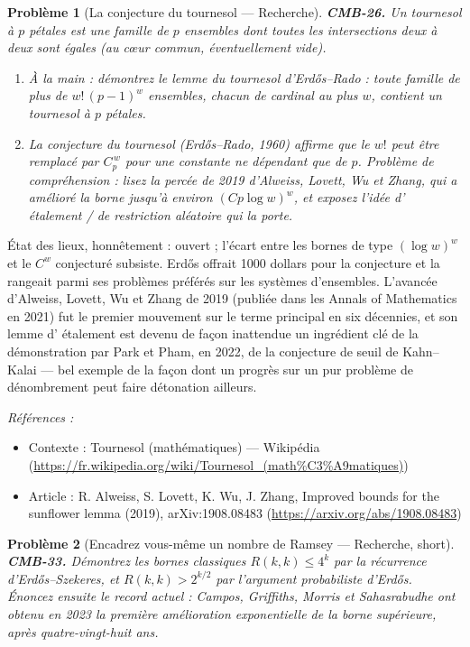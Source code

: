 \documentclass[11pt]{article}
\newtheorem{problem}{Problème}
\newenvironment{refs}{\par\small\noindent\emph{Références :}\begin{itemize}\setlength\itemsep{0pt}}{\end{itemize}\normalsize}
\begin{document}
\begin{problem}[{La conjecture du tournesol --- Recherche}]
\textbf{CMB-26.} Un tournesol à $ p $ pétales est une famille de $ p $ ensembles dont
toutes les intersections deux à deux sont égales (au \og{} c\oe{}ur \fg{} commun, éventuellement vide).
\begin{enumerate}
\item[(a)] À la main : démontrez le lemme du tournesol d'Erd\H{o}s--Rado : toute famille de plus de
$ w!\,(p-1)^w $ ensembles, chacun de cardinal au plus $ w $, contient un tournesol à
$ p $ pétales.
\item[(b)] La conjecture du tournesol (Erd\H{o}s--Rado, 1960) affirme que le $ w! $ peut être remplacé par
$ C_p^{\,w} $ pour une constante ne dépendant que de $ p $. Problème de compréhension : lisez
la percée de 2019 d'Alweiss, Lovett, Wu et Zhang, qui a amélioré la borne jusqu'à environ
$ (C p \log w)^w $, et exposez l'idée d'\og{} étalement \fg{} / de restriction aléatoire qui la
porte.
\end{enumerate}

\end{problem}

\noindent État des lieux, honnêtement : ouvert ; l'écart entre les bornes de type
$ (\log w)^w $ et le $ C^w $ conjecturé subsiste. Erd\H{o}s offrait 1000 dollars pour la
conjecture et la rangeait parmi ses problèmes préférés sur les systèmes d'ensembles. L'avancée
d'Alweiss, Lovett, Wu et Zhang de 2019 (publiée dans les Annals of Mathematics en 2021) fut le
premier mouvement sur le terme principal en six décennies, et son lemme d'\og{} étalement \fg{} est
devenu de façon inattendue un ingrédient clé de la démonstration par Park et Pham, en 2022, de la
conjecture de seuil de Kahn--Kalai --- bel exemple de la façon dont un progrès sur un pur problème de
dénombrement peut faire détonation ailleurs.

\begin{refs}
\item Contexte : Tournesol (mathématiques) --- Wikipédia (\url{https://fr.wikipedia.org/wiki/Tournesol_(math%C3%A9matiques)})
\item Article : R. Alweiss, S. Lovett, K. Wu, J. Zhang, \og{} Improved bounds for the sunflower lemma \fg{} (2019), arXiv:1908.08483 (\url{https://arxiv.org/abs/1908.08483})
\end{refs}

\bigskip

\begin{problem}[{Encadrez vous-même un nombre de Ramsey --- Recherche, short}]
\textbf{CMB-33.} Démontrez les bornes classiques $ R(k,k) \leq 4^{k} $ par la récurrence d'Erd\H{o}s--Szekeres, et $ R(k,k) > 2^{k/2} $ par l'argument probabiliste d'Erd\H{o}s. Énoncez ensuite le record actuel : Campos, Griffiths, Morris et Sahasrabudhe ont obtenu en 2023 la première amélioration exponentielle de la borne supérieure, après quatre-vingt-huit ans.
\end{problem}
\end{document}
